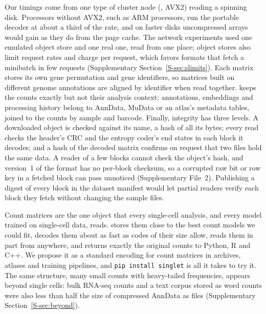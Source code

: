 Our timings come from one type of cluster node (, AVX2) reading a spinning disk. Processors without AVX2, such as
ARM processors, run the portable decoder at about a third of the rate, and on faster disks uncompressed arrays would gain
as they do from the page cache. The network experiments used one emulated object store and one real one, read from one
place; object stores also limit request rates and charge per request, which favors formats that fetch a minibatch in few
requests (Supplementary Section~\ref{S-sec:slimits}). Each matrix stores its own gene permutation and gene identifiers, so
matrices built on different genome annotations are aligned by identifier when read together. \sone{} keeps the counts
exactly but not their analysis context: annotations, embeddings and processing history belong to AnnData, MuData or an
atlas's metadata tables, joined to the counts by sample and barcode. Finally, integrity has three levels. A downloaded
object is checked against its name, a hash of all its bytes; every read checks the header's CRC and the entropy coder's
end states in each block it decodes; and a hash of the decoded matrix confirms on request that two files hold the same
data. A reader of a few blocks cannot check the object's hash, and version~1 of the format has no per-block checksum, so
a corrupted raw bit or row key in a fetched block can pass unnoticed (Supplementary File~2). Publishing a digest of every
block in the dataset manifest would let partial readers verify each block they fetch without changing the sample files.

\label{sec:conclusion}Count matrices are the one object that every single-cell analysis, and every model
trained on single-cell data, reads. \sone{} stores them close to the best count models we could fit, decodes them about as fast as codes of
their size allow, reads them in part from anywhere, and returns exactly the original counts to
Python, R and C++. We propose it as a standard encoding for count matrices in archives, atlases and training pipelines,
and \texttt{pip install singlet} is all it takes to try it. The same structure, many small counts with heavy-tailed
frequencies, appears beyond single cells: bulk RNA-seq counts and a text corpus stored as word counts were also less than
half the size of compressed AnnData as \sone{} files (Supplementary Section~\ref{S-sec:beyond}).
